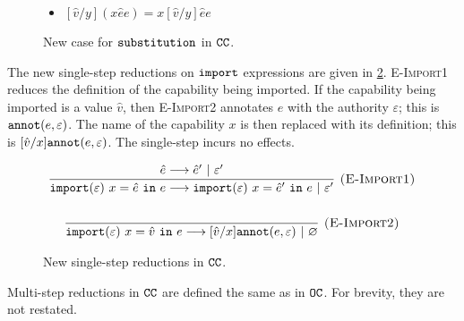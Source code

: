 \begin{figure}[h]


\begin{itemize}
	\setlength\itemsep{-0.7em}
	\item[] $[\hat v/y]({x}{\hat e}{e}) = {x}{[\hat v/y]\hat e}{e}$
\end{itemize}

\vspace{-7pt}
\caption{New case for $\mathtt{substitution}$ in $\mathtt{CC}$.}
\label{fig:epscalc_sub_defn}
\end{figure}

The new single-step reductions on $\mathtt{import}$ expressions are given in \ref{fig:opercalc_reductions}. \textsc{E-Import1} reduces the definition of the capability being imported. If the capability being imported is a value $\hat v$, then \textsc{E-Import2} annotates $e$ with the authority $\varepsilon$; this is $\mathtt{annot}(e, \varepsilon)$. The name of the capability $x$ is then replaced with its definition; this is $[\hat v/x]\mathtt{annot}(e, \varepsilon)$. The single-step incurs no effects.


\begin{figure}[h]

\noindent
{}

\[
\begin{array}{c}
\infer[\textsc{(E-Import1)}]
	{\kwa{import}(\varepsilon)~x = \hat e~\kw{in} e \longrightarrow \kwa{import}(\varepsilon)~x = \hat e'~\kw{in} e~|~\varepsilon'}
	{\hat e \longrightarrow \hat e'~|~\varepsilon'}\\[4ex]

\infer[\textsc{(E-Import2)}]
	{\kwa{import}(\varepsilon)~x = \hat v~\kw{in} e \longrightarrow [\hat v/x]\kwa{annot}(e, \varepsilon)~|~\varnothing}
	{}

\end{array}
\]


\vspace{-7pt}
\caption{New single-step reductions in $\mathtt{CC}$.}
\label{fig:opercalc_reductions}
\end{figure}

Multi-step reductions in $\mathtt{CC}$ are defined the same as in $\mathtt{OC}$. For brevity, they are not restated.

















